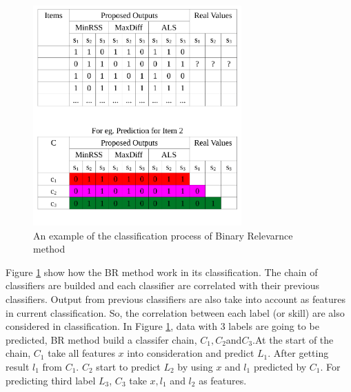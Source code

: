 \documentclass[12pt]{article}
\begin{document}
\begin{figure}[h]
  \centering
    \includegraphics[width=8cm]{graph/BR.pdf}
  \caption{An example of the classification process of Binary Relevarnce method}\label{fig:BR}
\end{figure}

  Figure \ref{fig:BR} show how the BR method work in its classification. The chain of classifiers are builded and each classifier are correlated with their previous classifiers. Output from previous classifiers are also take into account as features in current classification. So, the correlation between each label (or skill) are also considered in classification. In Figure \ref{fig:BR}, data with 3 labels are going to be predicted, BR method build a classifer chain, $C_{1},C_{2}$and$C_{3}$.At the start of the chain, $C_{1}$ take all features $x$ into consideration and predict $L_{1}$. After getting result $l_{1}$ from $C_{1}$. $C_{2}$ start to predict $L_{2}$ by using $x$ and $l_{1}$ predicted by $C_{1}$. For predicting third label $L_{3}$, $C_{3}$  take $x,l_{1}$ and $l_{2}$ as features.   
\end{document}
